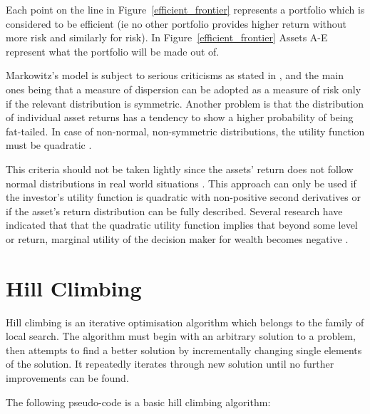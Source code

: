     Each point on the line in Figure~\ref{efficient_frontier} represents a portfolio which is considered to be efficient (ie no other portfolio provides higher return without more risk and similarly for risk). In Figure~\ref{efficient_frontier} Assets A-E represent what the portfolio will be made out of. 

    Markowitz's model is subject to serious criticisms as stated in \cite{crit}, and the main ones being that a measure of dispersion can be adopted as a measure of risk only if the relevant distribution is symmetric. Another problem is that the distribution of individual asset returns has a tendency to show a higher probability of being fat-tailed. In case of non-normal, non-symmetric distributions, the utility function must be quadratic \cite{crit}. 

    This criteria should not be taken lightly since the assets' return does not follow normal distributions in real world situations \cite{non-dist}. This approach can only be used if the investor's utility function is quadratic with non-positive second derivatives or if the asset's return distribution can be fully described. Several research have indicated that that the quadratic utility function implies that beyond some level or return, marginal utility of the decision maker for wealth becomes negative \cite{crit2,crit3}. 

  \section{Hill Climbing} %
  \label{sec:hill_climbing}
  Hill climbing \cite{hill,hill2} is an iterative optimisation algorithm which belongs to the family of local search. The algorithm must begin with an arbitrary solution to a problem, then attempts to find a better solution by incrementally changing single elements of the solution. It repeatedly iterates through new solution until no further improvements can be found. 

  The following pseudo-code is a basic hill climbing algorithm:

